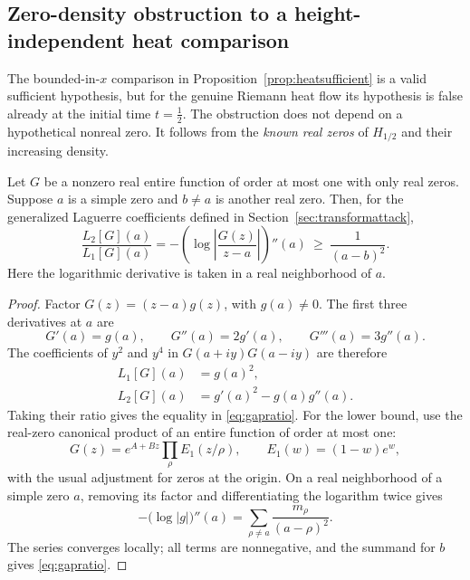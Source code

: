 \subsection{Zero-density obstruction to a height-independent heat comparison}
\label{subsec:heatgap}
The bounded-in-$x$ comparison in
Proposition~\ref{prop:heatsufficient} is a valid
sufficient hypothesis, but for the genuine
Riemann heat flow its hypothesis is false
already at the initial time $t=\tfrac12$.
The obstruction does not depend on a
hypothetical nonreal zero. It follows from
the \emph{known real zeros} of $H_{1/2}$
and their increasing density.

\begin{lemma}
\label{lem:gapratio}
Let $G$ be a nonzero real entire function
of order at most one with only real zeros.
Suppose $a$ is a simple zero and $b\ne a$
is another real zero. Then, for the
generalized Laguerre coefficients defined
in Section~\ref{sec:transformattack},
\begin{equation}
\frac{L_2[G](a)}{L_1[G](a)}
=-\left(\log\left|
\frac{G(z)}{z-a}\right|\right)''\!\!(a)
\ \ge\ \frac{1}{(a-b)^2}.
\label{eq:gapratio}
\end{equation}
Here the logarithmic derivative is taken
in a real neighborhood of $a$.
\end{lemma}
\begin{proof}
Factor $G(z)=(z-a)g(z)$, with $g(a)\ne0$.
The first three derivatives at $a$ are
\[
G'(a)=g(a),\qquad
G''(a)=2g'(a),\qquad
G'''(a)=3g''(a).
\]
The coefficients of $y^2$ and $y^4$
in $G(a+iy)G(a-iy)$ are therefore
\begin{align*}
L_1[G](a)&=g(a)^2,\\
L_2[G](a)&=g'(a)^2-g(a)g''(a).
\end{align*}
Taking their ratio gives the equality
in \eqref{eq:gapratio}.
For the lower bound, use the real-zero
canonical product of an entire function
of order at most one:
\[
G(z)=e^{A+Bz}
\prod_\rho E_1(z/\rho),
\qquad E_1(w)=(1-w)e^w,
\]
with the usual adjustment for zeros
at the origin. On a real neighborhood
of a simple zero $a$, removing its
factor and differentiating the
logarithm twice gives
\[
-\bigl(\log|g|\bigr)''(a)
=\sum_{\rho\ne a}\frac{m_\rho}{(a-\rho)^2}.
\]
The series converges locally;
all terms are nonnegative, and the
summand for $b$ gives
\eqref{eq:gapratio}.
\end{proof}

